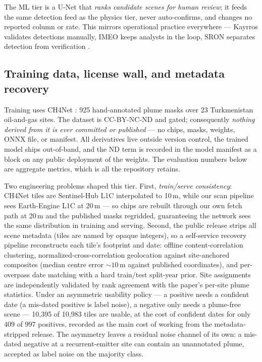 \documentclass[11pt]{article}
\begin{document}
The ML tier is a U-Net that \emph{ranks candidate scenes for human
review}; it feeds the same detection feed as the physics tier, never
auto-confirms, and changes no reported column or rate. This mirrors
operational practice everywhere --- Kayrros validates detections manually,
IMEO keeps analysts in the loop, SRON separates detection from
verification \citep{ehret2022,allen2025mars,schuit2023}.

\subsection{Training data, license wall, and metadata recovery}

Training uses CH4Net \citep{ch4net_dataset,vaughan2024}: 925 hand-annotated
plume masks over 23 Turkmenistan oil-and-gas sites. The dataset
is CC-BY-NC-ND and gated; consequently \emph{nothing derived from it is
ever committed or published} --- no chips, masks, weights, ONNX file, or
manifest. All derivatives live outside version control, the trained model
ships out-of-band, and the ND term is recorded in the model manifest as a
block on any public deployment of the weights. The evaluation numbers
below are aggregate metrics, which is all the repository retains.

Two engineering problems shaped this tier. First, \emph{train/serve
consistency}: CH4Net tiles are Sentinel-Hub L1C interpolated to 10\,m,
while our scan pipeline sees Earth-Engine L1C at 20\,m --- so chips are
rebuilt through our own fetch path at 20\,m and the published masks
regridded, guaranteeing the network sees the same distribution in training
and serving. Second, the public release strips all scene metadata (tiles
are named by opaque integers), so a self-service recovery pipeline
reconstructs each tile's footprint and date: offline content-correlation
clustering, normalized-cross-correlation geolocation against site-anchored
composites (median centre error ${\sim}10$\,m against published
coordinates), and per-overpass date matching with a hard train/test
split-year prior. Site assignments are independently validated by rank
agreement with the paper's per-site plume statistics. Under an asymmetric
usability policy --- a positive needs a confident date (a mis-dated
positive is label noise), a negative only needs a plume-free scene ---
10{,}395 of 10{,}983 tiles are usable, at the cost of confident dates for
only 409 of 997 positives, recorded as the main cost of working from the
metadata-stripped release. The asymmetry leaves a residual noise channel
of its own: a mis-dated negative at a recurrent-emitter site can contain
an unannotated plume, accepted as label noise on the majority class.
\end{document}
